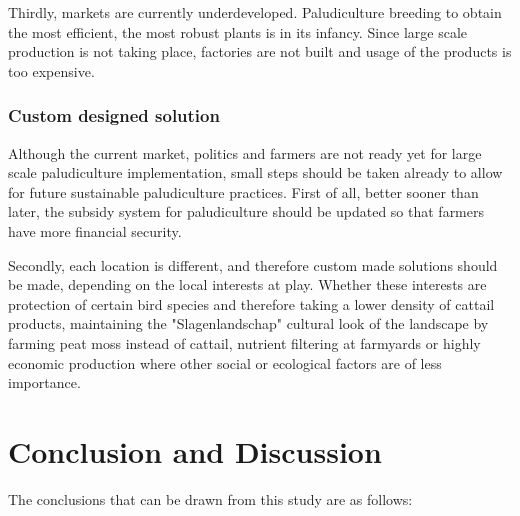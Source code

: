 {Thirdly, markets are currently underdeveloped. Paludiculture breeding to obtain the most efficient, the most robust plants is in its infancy. Since large scale production is not taking place, factories are not built and usage of the products is too expensive. 

\subsection{Custom designed solution}
Although the current market, politics and farmers are not ready yet for large scale paludiculture implementation, small steps should be taken already to allow for future sustainable paludiculture practices. First of all, better sooner than later, the subsidy system for paludiculture should be updated so that farmers have more financial security. 

Secondly, each location is different, and therefore custom made solutions should be made, depending on the local interests at play. Whether these interests are protection of certain bird species and therefore taking a lower density of cattail products, maintaining the "Slagenlandschap" cultural look of the landscape by farming peat moss instead of cattail, nutrient filtering at farmyards or highly economic production where other social or ecological factors are of less importance.

\chapter{Conclusion and Discussion} \label{ch:condis}

The conclusions that can be drawn from this study are as follows:

}
